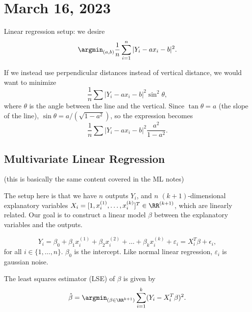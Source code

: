 \section{March 16, 2023}

Linear regression setup: we desire 
\[\argmin_{(a,b)}\frac{1}{n}\sum_{i=1}^n \vert Y_i-ax_i-b\vert^2.\]

If we instead use perpendicular distances instead of vertical distance, we would want to minimize 
\[\frac{1}{n}\sum \vert Y_i-ax_i-b\vert^2\sin^2\theta,\]
where $\theta$ is the angle between the line and the vertical. Since $\tan{\theta}=a$ (the slope of the line), $\sin{\theta}=a/(\sqrt{1-a^2})$, so the expression becomes 
\[\frac{1}{n}\sum \vert Y_i-ax_i-b\vert^2\frac{a^2}{1-a^2}.\]

\subsection{Multivariate Linear Regression}

(this is basically the same content covered in the ML notes)

The setup here is that we have $n$ outputs $Y_i$, and $n$ $(k+1)$-dimensional explanatory variables $X_i=[1, x_i^{(1)}, \hdots, x_i^{(k)}]^T\in \RR^{(k+1)}$, which are linearly related. Our goal is to construct a linear model $\beta$ between the explanatory variables and the outputs. 

\[Y_i = \beta_0 + \beta_1x_i^{(1)} + \beta_2x_i^{(2)} + \hdots + \beta_kx_i^{(k)} + \varepsilon_i = X_i^T\beta + \epsilon_i,\]
for all $i\in \{1, \hdots, n\}$. $\beta_0$ is the \ac{intercept}. Like normal linear regression, $\varepsilon_i$ is gaussian noise.

\begin{definition}

The \ac{least squares estimator} (LSE) of $\beta$ is given by 
\[\hat{\beta} = \argmin_{(\beta\in \RR^{k+1})}\sum_{i=1}^k(Y_i-X_i^T\beta)^2.\]
\end{definition}

